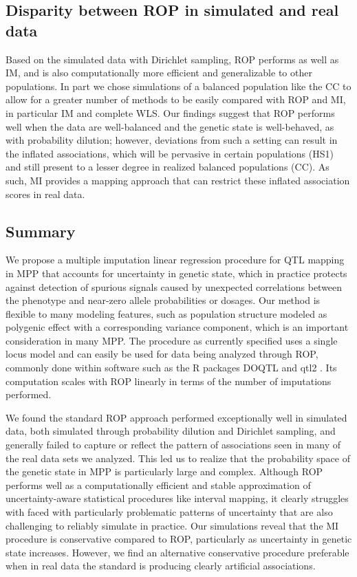 \subsection{Disparity between ROP in simulated and real data}

Based on the simulated data with Dirichlet sampling, ROP performs as well as IM, and is also computationally more efficient and generalizable to other populations. In part we chose simulations of a balanced population like the CC to allow for a greater number of methods to be easily compared with ROP and MI, in particular IM and complete WLS. Our findings suggest that ROP performs well when the data are well-balanced and the genetic state is well-behaved, as with probability dilution; however, deviations from such a setting can result in the inflated associations, which will be pervasive in certain populations (HS1) and still present to a lesser degree in realized balanced populations (CC). As such, MI provides a mapping approach that can restrict these inflated association scores in real data.

\subsection{Summary}

We propose a multiple imputation linear regression procedure for QTL mapping in MPP that accounts for uncertainty in genetic state, which in practice protects against detection of spurious signals caused by unexpected correlations between the phenotype and near-zero allele probabilities or dosages. Our method is flexible to many modeling features, such as population structure modeled as polygenic effect with a corresponding variance component, which is an important consideration in many MPP. The procedure as currently specified uses a single locus model and can easily be used for data being analyzed through ROP, commonly done within software such as the R packages DOQTL \citep{Gatti2014} and qtl2 \citep{Broman2017}. Its computation scales with ROP linearly in terms of the number of imputations performed.

We found the standard ROP approach performed exceptionally well in simulated data, both simulated through probability dilution and Dirichlet sampling, and generally failed to capture or reflect the pattern of associations seen in many of the real data sets we analyzed. This led us to realize that the probability space of the genetic state in MPP is particularly large and complex. Although ROP performs well as a computationally efficient and stable approximation of uncertainty-aware statistical procedures like interval mapping, it clearly struggles with faced with particularly problematic patterns of uncertainty that are also challenging to reliably simulate in practice. Our simulations reveal that the MI procedure is conservative compared to ROP, particularly as uncertainty in genetic state increases. However, we find an alternative conservative procedure preferable when in real data the standard is producing clearly artificial associations.

